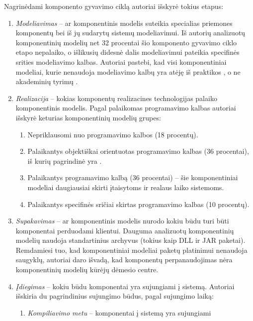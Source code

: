 Nagrinėdami komponento gyvavimo ciklą autoriai išskyrė tokius
etapus:
\begin{enumerate}
  \item \emph{Modeliavimas} – ar komponentinis modelis suteikia
    specialias priemones komponentų bei iš jų sudarytų sistemų
    modeliavimui. Iš autorių analizuotų komponentinių modelių net
    32 procentai šio komponento gyvavimo ciklo etapo nepalaiko,
    o išlikusių didesnė dalis modeliavimui pateikia specifinės
    srities  modeliavimo kalbas. Autoriai
    pastebi, kad visi komponentiniai modeliai, kurie nenaudoja
    modeliavimo kalbų yra atėję iš praktikos , o ne akademinių tyrimų 
    \cite[604]{classification-framework-for-scm}.
  \item \emph{Realizacija} – kokias komponentų realizacines technologijas
    palaiko komponentinis modelis. Pagal palaikomas programavimo kalbas
    autoriai išskyrė keturias komponentinių modelių grupes:
    \begin{enumerate}
      \item Nepriklausomi nuo programavimo kalbos (18 procentų).
      \item Palaikantys objektiškai orientuotas programavimo kalbas
        (36 procentai), iš kurių pagrindinė yra .
      \item Palaikantys  programavimo kalbą (36 procentai)
        – šie komponentiniai modeliai daugiausiai skirti įtaisytoms
         ir realaus laiko sistemoms.
      \item Palaikantys specifinės sričiai  skirtas
        programavimo kalbas (10 procentų).
    \end{enumerate}
  \item \emph{Supakavimas} – ar komponentinis modelis nurodo kokiu
    būdu turi būti komponentai perduodami klientui. Dauguma
    analizuotų komponentinių modelių naudoja standartinius archyvus
    (tokius kaip DLL ir JAR paketai). Remdamiesi tuo, kad komponentiniai
    modeliai paketų platinimui nenaudoja saugyklų, autoriai daro
    išvadą, kad komponentų perpanaudojimas nėra komponentinių
    modelių kūrėjų dėmesio centre.
  \item \emph{Įdiegimas} – kokiu būdu komponentai yra sujungiami į sistemą.
    Autoriai išskiria du pagrindinius sujungimo būdus, pagal
    sujungimo laiką:
    \begin{enumerate}
      \item \emph{Kompiliavimo metu} – komponentai į sistemą yra sujungiami

\end{enumerate}
\end{enumerate}
